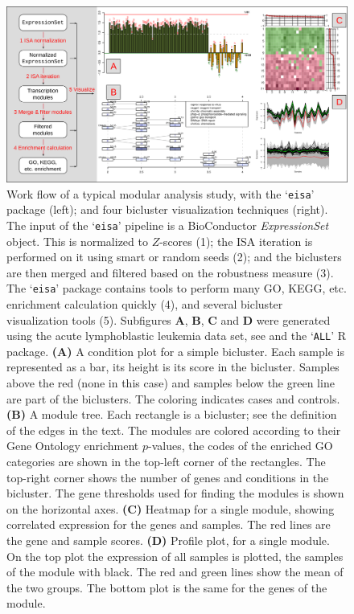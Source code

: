 \documentclass{bioinfo}
\newcommand{\Rpackage}[1]{`\texttt{#1}'}
\newcommand{\Rclass}[1]{\textsl{#1}}
\newcommand{\subfig}[1]{\textbf{#1}}
\begin{document}
\begin{figure}
\centering
\includegraphics[width=\textwidth]{isa2workflow3}
\caption{Work flow of a typical modular analysis study, with the
  \Rpackage{eisa} package (left); and four bicluster visualization
  techniques (right). The input of the \Rpackage{eisa} pipeline is a
  BioConductor \Rclass{ExpressionSet} object. This is normalized to
  $Z$-scores (1); the ISA iteration is performed on it using smart or
  random seeds (2); and the biclusters are then merged and filtered
  based on the robustness measure (3). The \Rpackage{eisa} package
  contains tools to perform many GO, KEGG, etc. enrichment calculation
  quickly (4), and several bicluster visualization tools (5).
  Subfigures \subfig{A}, \subfig{B}, \subfig{C} and \subfig{D} were generated
  using the acute lymphoblastic leukemia data set, see
  \cite{chiaretti04} and the \Rpackage{ALL} R package.
  \subfig{(A)} A condition plot for a simple bicluster. Each sample is
  represented as a bar, its height is its score in the bicluster. 
  Samples above the red (none in this case) and samples
  below the green line are part of the biclusters. The coloring
  indicates cases and controls.
  \subfig{(B)} A module tree. Each rectangle is a bicluster; see the
  definition of the edges in the text. The modules are colored
  according to their Gene Ontology enrichment $p$-values, the codes of
  the enriched GO categories are shown in the top-left corner of the
  rectangles. The top-right corner shows the number of genes and
  conditions in the bicluster. The gene thresholds used for finding
  the modules is shown on the horizontal axes.
  \subfig{(C)} Heatmap for a single module, showing correlated
  expression for the genes and samples. The red lines are the gene and
  sample scores.
  \subfig{(D)} Profile plot, for a single module. On the top plot the
  expression of all samples is plotted, the samples of the module
  with black. The red and green lines show the mean of the two
  groups. The bottom plot is the same for the genes of the module.
}
\label{fig:workflow}
\end{figure}
\end{document}
